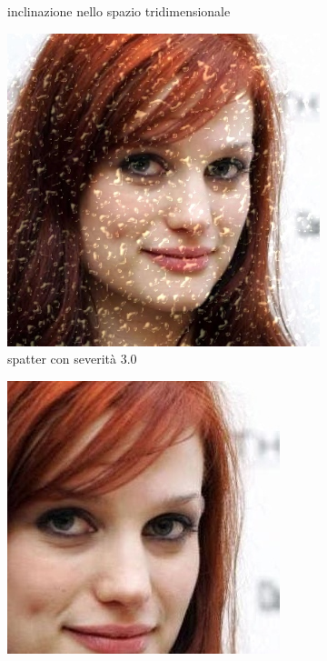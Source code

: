 \begin{figure}[ht]
\begin{subfigure}[t]{0.18\textwidth}
\caption{inclinazione nello spazio tridimensionale}
\label{sfig:corruption_skew}
\end{subfigure}\hfill
\begin{subfigure}[t]{0.18\textwidth}
\includegraphics[width=\textwidth]{./Images/spatter_severity_3.jpg}
\caption{spatter con severità $3.0$}
\label{sfig:corruption_spatter}
\end{subfigure}\hfill
\begin{subfigure}[t]{0.18\textwidth}
\includegraphics[width=\textwidth]{./Images/random_crop_severity_0.3.jpg}

\end{subfigure}
\end{figure}
